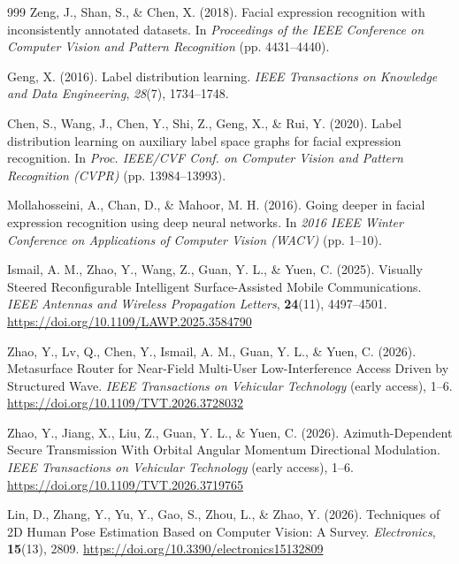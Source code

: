 \documentclass[algorithms,article,submit,moreauthors]{Definitions/mdpi}
\newcommand{\rev}[1]{\textcolor{revcolor}{#1}}
\begin{document}
{\begin{thebibliography}{999}
Zeng, J., Shan, S., \& Chen, X. (2018). Facial expression recognition with inconsistently annotated datasets. In \textit{Proceedings of the IEEE Conference on Computer Vision and Pattern Recognition} (pp. 4431--4440).

Geng, X. (2016). Label distribution learning. \textit{IEEE Transactions on Knowledge and Data Engineering}, \textit{28}(7), 1734--1748.

Chen, S., Wang, J., Chen, Y., Shi, Z., Geng, X., \& Rui, Y. (2020). Label distribution learning on auxiliary label space graphs for facial expression recognition. In \textit{Proc. IEEE/CVF Conf. on Computer Vision and Pattern Recognition (CVPR)} (pp. 13984--13993).

Mollahosseini, A., Chan, D., \& Mahoor, M. H. (2016). Going deeper in facial expression recognition using deep neural networks. In \textit{2016 IEEE Winter Conference on Applications of Computer Vision (WACV)} (pp. 1--10).

\rev{Ismail, A. M., Zhao, Y., Wang, Z., Guan, Y. L., \& Yuen, C. (2025). Visually Steered Reconfigurable Intelligent Surface-Assisted Mobile Communications. \textit{IEEE Antennas and Wireless Propagation Letters}, \textbf{24}(11), 4497--4501. \url{https://doi.org/10.1109/LAWP.2025.3584790}}

\rev{Zhao, Y., Lv, Q., Chen, Y., Ismail, A. M., Guan, Y. L., \& Yuen, C. (2026). Metasurface Router for Near-Field Multi-User Low-Interference Access Driven by Structured Wave. \textit{IEEE Transactions on Vehicular Technology} (early access), 1--6. \url{https://doi.org/10.1109/TVT.2026.3728032}}

\rev{Zhao, Y., Jiang, X., Liu, Z., Guan, Y. L., \& Yuen, C. (2026). Azimuth-Dependent Secure Transmission With Orbital Angular Momentum Directional Modulation. \textit{IEEE Transactions on Vehicular Technology} (early access), 1--6. \url{https://doi.org/10.1109/TVT.2026.3719765}}

\rev{Lin, D., Zhang, Y., Yu, Y., Gao, S., Zhou, L., \& Zhao, Y. (2026). Techniques of 2D Human Pose Estimation Based on Computer Vision: A Survey. \textit{Electronics}, \textbf{15}(13), 2809. \url{https://doi.org/10.3390/electronics15132809}}

\end{thebibliography}
}

\end{document}
